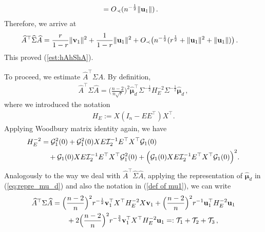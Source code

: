 \documentclass[12pt]{article}
\numberwithin{equation}{section}
\theoremstyle{remark}
\newcommand{\1}{{\rm 1}\kern-0.24em{\rm I}}
\begin{document}
\begin{appendices}
\begin{align*}
&= O_\prec(n^{-\frac 12} \Vert {\bf u}_1\Vert)\, .
\end{align*}
 Therefore, we arrive at 
 \begin{align*} %
\widehat A^{\top} \widehat \Sigma \widehat A 
&=  \frac{r}{1-r} \Vert {\bf v}_1\Vert^2 +  \frac{1}{1-r}\Vert {\bf u}_1\Vert^2     + O_\prec \big(n^{-\frac 12}(r^{\frac 12} + \Vert {\bf u}_1\Vert^2 + \Vert {\bf u}_1\Vert )  \big)\, .
\end{align*}
This proved  (\ref{est:hAhShA}).

To proceed, we  estimate $\widehat A^{\top} \Sigma \widehat A $. By definition, 
\begin{align*}
\widehat A^{\top} \Sigma \widehat A =\Big(\frac {n-2}{n\sqrt r}\Big)^2\hat {\bm{\mu}}_d^{\top} \Sigma^{-\frac12} H_E^{-2}  \Sigma^{-\frac12}\hat {\bm{\mu}}_d\, ,
\end{align*}
where we introduced the notation 
\begin{align*}
H_E:={{X}}( I_n - {{E}}{{E}}^{\top}) {{X}}^{\top}.
\end{align*}
Applying Woodbury matrix identity again, we have 
\begin{align}\label{eq:X_XT-2}
H_E^{-2} &= \mathcal{G}_1^2(0) + \mathcal{G}_1^2(0)  {X}{E}  \mathcal{I}_2^{-1} {E}^{\top} {{X}}^{\top}  \mathcal{G}_1(0) \notag\\
&\quad +  \mathcal{G}_1(0)  {X}{E}  \mathcal{I}_2^{-1} {E}^{\top} {{X}}^{\top}  \mathcal{G}_1^2(0)+   \Big(\mathcal{G}_1(0)  {X}{E}  \mathcal{I}_2^{-1} {E}^{\top} {{X}}^{\top}  \mathcal{G}_1(0)\Big)^2. 
\end{align}
Analogously to the way we deal with $\widehat A^{\top} \widehat \Sigma \widehat A $, applying the representation of  $\hat {\bm{\mu}}_d$ in (\ref{eq:repre_mu_d}) and also the notation in (\ref{def of mu1}), we can write
\begin{align}\label{def:rewrite ASigmaA}
\widehat A^{\top} \Sigma \widehat A &=\Big(\frac {n-2}{n}\Big)^2r^{-\frac 12}{\bf v}_1^{\top} {X}^{\top} H_E^{-2} {X}{\bf v}_1
+ \Big(\frac {n-2}{n}\Big)^2 r^{-1}{\bf u}_1^{\top}  H_E^{-2}{\bf u}_1 \notag\\
&\qquad +2 \Big(\frac {n-2}{n}\Big)^2 r^{-\frac 34}{\bf v}_1^{\top} {X}^{\top} H_E^{-2} {\bf u}_1=: \mathcal{T}_1 + \mathcal{T}_2 + \mathcal{T}_3\,,

\end{align}
\end{appendices}
\end{document}
